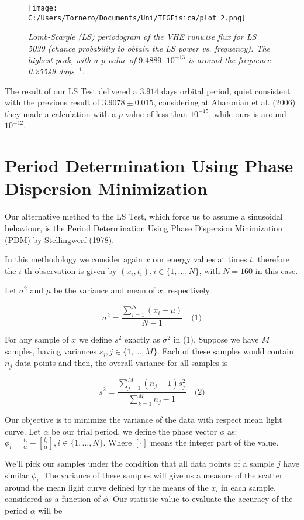 \documentclass[twocolumn]{revtex4}
\begin{document}
\begin{figure}[h!]
\centering
\texttt{[image: C:/Users/Tornero/Documents/Uni/TFGFisica/plot\_2.png]}
\caption{\textit{Lomb-Scargle (LS) periodogram of the VHE runwise flux for LS 5039 (chance probability to obtain the LS power vs. frequency). The highest peak, with a p-value of $9.4889 \cdot 10^{-13}$ is around the frequence  0.25549 days$^{-1}$.}}
\label{fig:sample}
\end{figure}

The result of our LS Test delivered a $3.914$ days orbital period, quiet consistent with the previous result of $3.9078 \pm 0.015$, considering at Aharonian et al. (2006) they made a calculation with a $p$-value of less than $10^{-15}$, while ours is around $10^{-12}$.

\section{ Period Determination Using Phase Dispersion Minimization }

Our alternative method to the LS Test, which force us to assume a sinusoidal behaviour, is the Period Determination Using Phase Dispersion Minimization (PDM) by Stellingwerf (1978).

In this methodology we consider again $x$ our energy values at times $t$, therefore the $i$-th observation is given by $(x_i, t_i), i \in \{1, \ldots, N \}$, with $N=160$ in this case.

Let $\sigma^2$ and $\mu$ be the variance and mean of $x$, respectively 

$$
\sigma^2=\dfrac{\sum\limits_{i=1}^{N}(x_i - \mu)}{N-1}  \quad \text{(1)}
$$

For any sample of $x$ we define $s^2$ exactly as $\sigma^2$ in (1). Suppose we have $M$ samples, having variances $s_j, j \in \{1, \ldots, M\}$. Each of these samples would contain $n_j$ data points and then, the overall variance for all samples is

$$
s^2 = \dfrac{\sum\limits_{j = 1}^{M}(n_j - 1)s_j^2}{\sum\limits_{k=1}^{M}n_j-1} \quad \text{(2)}
$$

Our objective is to minimize the variance of the data with respect mean light curve. Let $\alpha$ be our trial period, we define the phase vector $\phi$ as: $\displaystyle \phi_i = \frac{t_i}{\alpha}-[\frac{t_i}{\alpha}], i \in \{1, \ldots, N\}$. Where $[ \cdot ]$ means the integer part of the value.

We'll pick our samples under the condition that all data points of a sample $j$ have similar $\phi_i$. The variance of these samples will give us a measure of the scatter around the mean light curve defined by the means of the $x_i$ in each sample, considered as a function of $\phi$. Our statistic value to evaluate the accuracy of the period $\alpha$ will be
\end{document}
